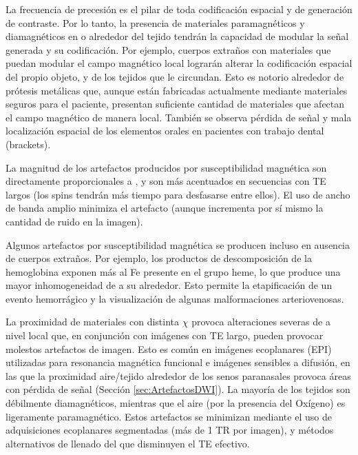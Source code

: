 La frecuencia de precesión es el pilar de toda codificación espacial y de generación de contraste. Por lo tanto, la presencia de materiales paramagnéticos y diamagnéticos en o alrededor del tejido tendrán la capacidad de modular la señal generada y su codificación. Por ejemplo, cuerpos extraños con materiales que puedan modular el campo magnético local lograrán alterar la codificación espacial del propio objeto, y de los tejidos que le circundan. Esto es notorio alrededor de prótesis metálicas que, aunque están fabricadas actualmente mediante materiales seguros para el paciente, presentan suficiente cantidad de materiales que afectan el campo magnético de manera local. También se observa pérdida de señal y mala localización espacial de los elementos orales en pacientes con trabajo dental (brackets). 

La magnitud de los artefactos producidos por susceptibilidad magnética son directamente proporcionales a \Bzero, y son más acentuados en secuencias con TE largos (los spins tendrán más tiempo para desfasarse entre ellos). El uso de ancho de banda amplio minimiza el artefacto (aunque incrementa por sí mismo la cantidad de ruido en la imagen).

Algunos artefactos por susceptibilidad magnética se producen incluso en ausencia de cuerpos extraños. Por ejemplo, los productos de descomposición de la hemoglobina exponen más al Fe presente en el grupo heme, lo que produce una mayor inhomogeneidad de \Bzero a su alrededor. Esto permite la etapificación de un evento hemorrágico y la visualización de algunas malformaciones arteriovenosas. 

La proximidad de materiales con distinta $\chi$ provoca alteraciones severas de \Bzero a nivel local que, en conjunción con imágenes con TE largo, pueden provocar molestos artefactos de imagen. Esto es común en imágenes ecoplanares (EPI) utilizadas para resonancia magnética funcional e imágenes sensibles a difusión, en las que la proximidad aire/tejido alrededor de los senos paranasales provoca áreas con pérdida de señal (Sección \ref{sec:ArtefactosDWI}). La mayoría de los tejidos son débilmente diamagnéticos, mientras que el aire (por la presencia del Oxígeno) es ligeramente paramagnético. Estos artefactos se minimizan mediante el uso de adquisiciones ecoplanares segmentadas (más de 1 TR por imagen), y métodos alternativos de llenado del \espaciok que disminuyen el TE efectivo. 


